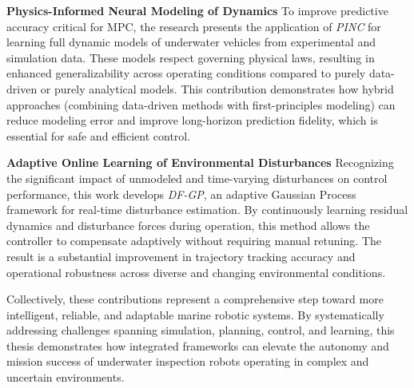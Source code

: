 \vspace{0.75em}

\noindent \textbf{Physics-Informed Neural Modeling of Dynamics}  
To improve predictive accuracy critical for MPC, the research presents the application of \textit{PINC} for learning full dynamic models of underwater vehicles from experimental and simulation data. These models respect governing physical laws, resulting in enhanced generalizability across operating conditions compared to purely data-driven or purely analytical models. This contribution demonstrates how hybrid approaches (combining data-driven methods with first-principles modeling) can reduce modeling error and improve long-horizon prediction fidelity, which is essential for safe and efficient control.

\vspace{0.75em}

\noindent \textbf{Adaptive Online Learning of Environmental Disturbances}  
Recognizing the significant impact of unmodeled and time-varying disturbances on control performance, this work develops \textit{DF-GP}, an adaptive Gaussian Process framework for real-time disturbance estimation. By continuously learning residual dynamics and disturbance forces during operation, this method allows the controller to compensate adaptively without requiring manual retuning. The result is a substantial improvement in trajectory tracking accuracy and operational robustness across diverse and changing environmental conditions.

\vspace{0.75em}

\noindent Collectively, these contributions represent a comprehensive step toward more intelligent, reliable, and adaptable marine robotic systems. By systematically addressing challenges spanning simulation, planning, control, and learning, this thesis demonstrates how integrated frameworks can elevate the autonomy and mission success of underwater inspection robots operating in complex and uncertain environments.
